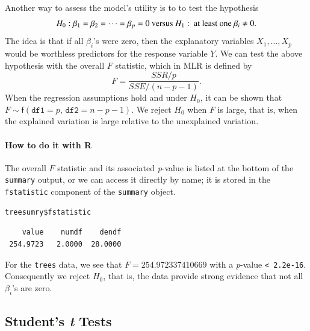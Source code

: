 \documentclass[captions=tableheading]{scrbook}
\begin{document}
Another way to assess the model's utility is to to test the hypothesis
\[
H_{0}:\beta_{1}=\beta_{2}=\cdots=\beta_{p}=0\mbox{ versus }H_{1}:\mbox{ at least one \ensuremath{\beta_{i}\neq0}}.
\]
The idea is that if all $\beta_{i}$'s were zero, then the explanatory variables $X_{1},\ldots,X_{p}$ would be worthless predictors for the response variable $Y$. We can test the above hypothesis with the overall $F$ statistic, which in MLR is defined by
\begin{equation}
F=\frac{SSR/p}{SSE/(n-p-1)}.
\end{equation}
When the regression assumptions hold and under $H_{0}$, it can be shown that $F\sim\mathsf{f}(\mathtt{df1}=p,\,\mathtt{df2}=n-p-1)$. We reject $H_{0}$ when $F$ is large, that is, when the explained variation is large relative to the unexplained variation.

\paragraph*{How to do it with \textsf{R}}

The overall $F$ statistic and its associated \emph{p}-value is listed at the bottom of the \texttt{summary} output, or we can access it directly by name; it is stored in the \texttt{fstatistic} component of the \texttt{summary} object. 


\begin{verbatim}
treesumry$fstatistic
\end{verbatim}

\begin{verbatim}
    value    numdf    dendf 
 254.9723   2.0000  28.0000
\end{verbatim}

For the \texttt{trees} data, we see that \( F =  254.972337410669 \) with a \emph{p}-value \texttt{< 2.2e-16}. Consequently we reject $H_{0}$, that is, the data provide strong evidence that not all $\beta_{i}$'s are zero.
\subsection{Student's \emph{t} Tests}
\label{sec-1-3-3}

\label{sub:mlr-Student's-t-Tests}
\end{document}
